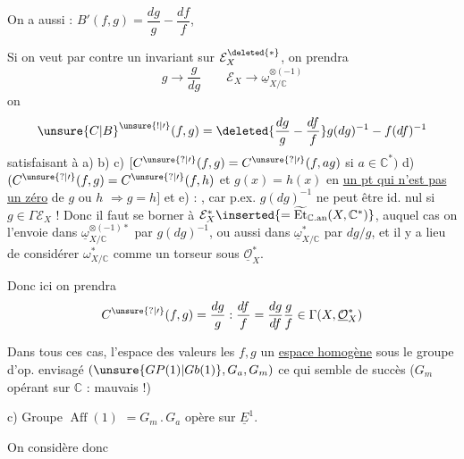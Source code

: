 On a aussi : $B'(f,g)=\dfrac{dg}{g}-\dfrac{df}{f}$, \unsure{\ldots}

Si on veut par contre un invariant sur $\mathcal E_X^{\deleted{*}}$, on prendra
\[
g\longrightarrow\frac{g}{dg}\qquad
\mathcal E_X\longrightarrow\underline\omega_{X/\mathbb C}^{\otimes(-1)}
\]
on  
\[
\unsure{C|B}^{\unsure{!|\prime}}(f,g)=
\deleted{\frac{dg}{g}-\frac{df}{f}}
g(dg)^{-1}-f(df)^{-1}
\]
satisfaisant à a) b) c)
$[C^{\unsure{?|\prime}}(f,g)=C^{\unsure{?|\prime}}(f,ag)$
si $a\in\mathbb C^*)$
d) $(C^{\unsure{?|\prime}}(f,g)=C^{\unsure{?|\prime}}(f,h)$ et
$g(x)=h(x)$ en \uline{un pt qui n'est pas un zéro} de $g$ ou $h$
$\Longrightarrow g=h]$ et e) 
 : , car
p.ex. $g(dg)^{-1}$ ne peut être id. nul si $g\in\Gamma \mathcal E_X$ !
Donc il faut se borner à
$\mathcal E_X^*\inserted{=\widetilde{\operatorname{Et}}_{\mathbb C.\mathrm{an}}
(X,\mathbb C^*)}$, auquel cas on l'envoie dans
$\underline\omega_{X/\mathbb C}^{\otimes(-1)*}$ par $g(dg)^{-1}$,
ou aussi dans $\underline\omega_{X/\mathbb C}^*$ par $dg/g$,
et il y a lieu de considérer $\omega_{X/\mathbb C}^*$ comme un torseur
sous $\underline{\mathcal O}_X^*$.

Donc ici on prendra
\[
C^{\unsure{?|\prime}}(f,g)=\frac{dg}{g}:\frac{df}{f}
=\frac{dg}{df}\frac{g}{f}\in\Gamma(X,\underline{\mathcal O}_X^*)
\]

Dans tous ces cas, l'espace des valeurs  les $f,g$
 un \uline{espace homogène} sous le groupe d'op.
envisagé $(\unsure{GP(1)|Gb(1)},G_a,G_m)$ ce qui semble
 de succès ($G_m$ opérant sur $\mathbb C$ : mauvais !)

c) Groupe $\operatorname{Aff}(1)$ 
$=G_m\mathbin{.}G_a$ opère sur $\underline E^1$.

On considère donc

